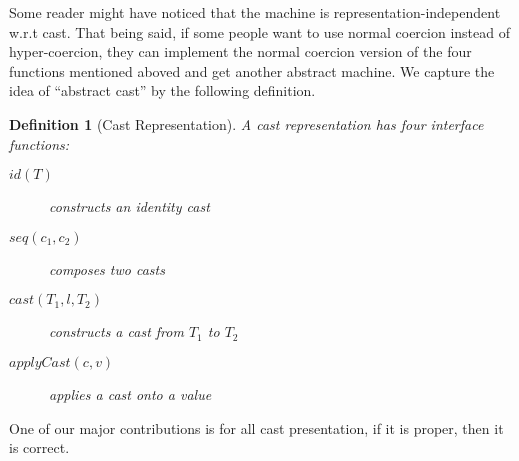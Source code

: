 \documentclass[acmsmall,review,anonymous]{acmart}\settopmatter{printfolios=true,printccs=false,printacmref=false}
\newtheorem{definition}{Definition}
\begin{document}
Some reader might have noticed that the machine is representation-independent 
w.r.t cast. That being said, if some people want to use normal coercion instead 
of hyper-coercion, they can implement the normal coercion version of the four 
functions mentioned aboved and get another abstract machine. We capture the 
idea of ``abstract cast'' by the following definition.

\begin{definition}[Cast Representation]
	A cast representation has four interface functions:
	\begin{description}
		\item[$ id(T) $] constructs an identity cast
		\item[$ seq(c_1,c_2) $] composes two casts
		\item[$ cast(T_1,l,T_2) $] constructs a cast from $ T_1 $ to $ T_2 $
		\item[$ applyCast(c,v) $] applies a cast onto a value
	\end{description}
\end{definition}

One of our major contributions is for all cast presentation, if it is proper, 
then it is correct.
\end{document}
